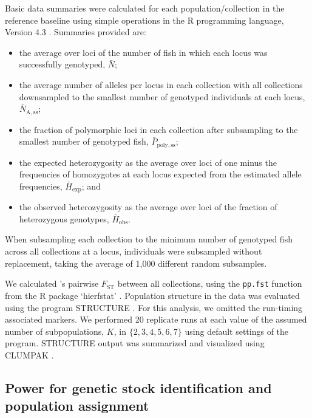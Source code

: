 Basic data summaries were calculated for each population/collection
in the reference baseline
using simple operations in the R programming language, Version 4.3
\citep{rcore}. Summaries provided are:
\begin {itemize}
\item the average over loci of the number of fish
in which each locus was successfully genotyped, $\bar{N}$;
\item the average number of alleles per locus in each collection with all collections
downsampled to the smallest number of genotyped individuals at each
locus, $\bar{N}_\mathrm{A,ss}$;
\item the fraction of polymorphic
loci in each collection after subsampling to the smallest number of genotyped
fish, $\bar{P}_\mathrm{poly,ss}$;
\item the expected heterozygosity as the average over loci
of one minus the frequencies of homozygotes at each locus expected from the
estimated allele frequencies, $\bar{H}_\mathrm{exp}$; and
\item the observed heterozygosity as the average over
loci of the fraction of heterozygous genotypes, $\bar{H}_\mathrm{obs}$.
\end{itemize}
When subsampling each collection to the minimum number of genotyped
fish across all collections at a locus, individuals were subsampled without
replacement, taking the average of 1,000 different random subsamples.

We calculated \citet{weir1984estimating}'s pairwise $F_\mathrm{ST}$ between
all collections, using the {\footnotesize\tt pp.fst} function from the R
package `hierfstat' \citep{hierfstat}. Population
structure in the data was evaluated
using the program STRUCTURE \citep{pritchard2000inference,falush2003inference}.
For this analysis, we omitted the run-timing associated markers.
We performed 20 replicate runs at each value of the assumed number of
subpopulations, $K$, in $\{2, 3, 4, 5, 6, 7\}$
using default settings of the program.  STRUCTURE output was
summarized and visualized using CLUMPAK
\citep{kopelman2015clumpak}.






\subsection*{Power for genetic stock identification and population assignment}


